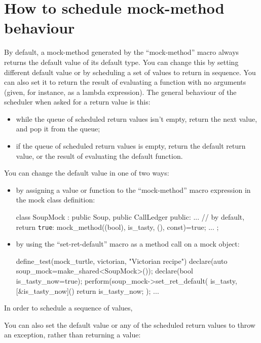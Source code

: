 \documentclass[twoside, a4paper, article]{memoir}
\begin{document}
\section{How to schedule mock-method behaviour}
\label{sec:schedule-mock-method}

By default, a mock-method generated by the ``mock-method'' macro always returns
the default value of its default type.  You can change this by setting
different default value or by scheduling a set of values to return in sequence.
You can also set it to return the result of evaluating a function with no
arguments (given, for instance, as a lambda expression).  The general behaviour
of the scheduler when asked for a return value is this:
\begin{itemize}
\item while the queue of scheduled return values isn't empty, return the next
  value, and pop it from the queue;
\item if the queue of scheduled return values is empty, return the default
  return value, or the result of evaluating the default function.
\end{itemize}

You can change the default value in one of two ways:
\begin{itemize}
\item by assigning a value or function to the ``mock-method'' macro expression
  in the mock class definition:
\begin{cpplisting}
class SoupMock
  : public Soup, public CallLedger {
public:
  ...
  // by default, return \texttt{true}:
  mock_method((bool), is_tasty, (), const)=true;
  ...
};
\end{cpplisting}
\item by using the ``set-ret-default'' macro as a method call on a mock object:
\begin{cpplisting}
define_test(mock_turtle, victorian, "Victorian recipe") {
  declare(auto soup_mock=make_shared<SoupMock>());
  declare(bool is_tasty_now=true);
  perform(soup_mock->set_ret_default(
            is_tasty,
            [&is_tasty_now]() { return is_tasty_now; });
  ...
}
\end{cpplisting}
\end{itemize}

In order to schedule a sequence of values,

You can also set the default value or any of the scheduled return values to
throw an exception, rather than returning a value:
\end{document}
